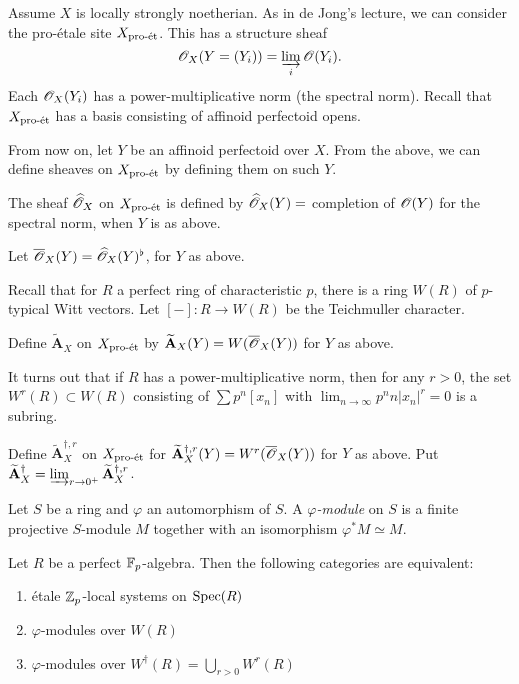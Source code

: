 Assume $X$ is locally strongly noetherian. As in de Jong's lecture, we can 
consider the pro-\'etale site $X_{\textnormal{pro-\'et}}$. This has a structure sheaf 
\[
  \mathscr{O}_X(Y=(Y_i)) = \varinjlim_i \mathscr{O}(Y_i) .
\]
Each $\mathscr{O}_X(Y_i)$ has a power-multiplicative norm (the spectral norm). Recall 
that $X_{\textnormal{pro-\'et}}$ has a basis consisting of affinoid perfectoid opens. 

From now on, let $Y$ be an affinoid perfectoid over $X$. From the above, we can 
define sheaves on $X_{\textnormal{pro-\'et}}$ by defining them on such $Y$. 

\begin{definition}
The sheaf $\widehat{\mathscr{O}}_X$ on $X_{\textnormal{pro-\'et}}$ is defined by $\widehat{\mathscr{O}}_X(Y)=$ completion 
of $\mathscr{O}(Y)$ for the spectral norm, when $Y$ is as above. 
\end{definition}

\begin{definition}
Let $\overline{\mathscr{O}}_X(Y) = \widehat{\mathscr{O}}_X(Y)^\flat$, for $Y$ as above. 
\end{definition}

Recall that for $R$ a perfect ring of characteristic $p$, there is a ring 
$W(R)$ of $p$-typical Witt vectors. Let $[-]:R\to W(R)$ be the Teichmuller 
character. 

\begin{definition}
Define $\widetilde{\mathbf A}_X$ on $X_{\textnormal{pro-\'et}}$ by $\widetilde{\mathbf A}_X(Y)=W(\overline{\mathscr{O}}_X(Y))$ for $Y$ as above. 
\end{definition}

It turns out that if $R$ has a power-multiplicative norm, then for any $r>0$, 
the set $W^r(R)\subset W(R)$ consisting of $\sum p^n [x_n]$ with 
$\lim_{n\to \infty} p^nn |x_n|^r=0$ is a subring. 

\begin{definition}
Define $\widetilde{\mathbf A}_X^{\dagger,r}$ on $X_{\textnormal{pro-\'et}}$ for 
$\widetilde{\mathbf A}_X^{\dagger,r}(Y)=W^r(\overline{\mathscr{O}}_X(Y))$ for $Y$ as 
above. Put $\widetilde{\mathbf A}_X^\dagger = \varinjlim_{r\to 0^+} \widetilde{\mathbf A}_X^{\dagger,r}$. 
\end{definition}

Let $S$ be a ring and $\varphi$ an automorphism of $S$. A \emph{$\varphi$-module} on 
$S$ is a finite projective $S$-module $M$ together with an isomorphism 
$\varphi^\ast M\simeq M$. 

\begin{theorem}
Let $R$ be a perfect $\mathbb{F}_p$-algebra. Then the following categories are equivalent:
\begin{enumerate}
  \item \'etale $\mathbb{Z}_p$-local systems on $\operatorname{Spec}(R)$
  \item $\varphi$-modules over $W(R)$
  \item $\varphi$-modules over $W^\dagger(R) = \bigcup_{r>0} W^r(R)$
\end{enumerate}
\end{theorem}

